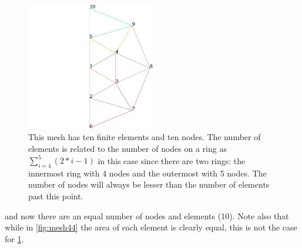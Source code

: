 \documentclass[12pt,times,twocolumn,3p]{elsarticle}
\begin{document}
\begin{figure}[h]
    \centering
    \includegraphics[width=0.5\textwidth]{./mesh_45.pdf}
    \caption{This mesh has ten finite elements and ten nodes. The number of
    elements is related to the number of nodes on a ring as
    $\sum_{i=4}^{5}(2*i-1)$ in this case since there are two rings: the innermost
    ring with 4 nodes and the outermost with 5 nodes. The number of nodes
    will always be lesser than the number of elements past this point.}
    \label{fig:mesh45}
\end{figure}
and now there are an equal number of nodes and elements (10). Note also that while
in \cref{fig:mesh44} the area of each element is clearly equal, this is not the
case for \cref{fig:mesh45}.
\end{document}

